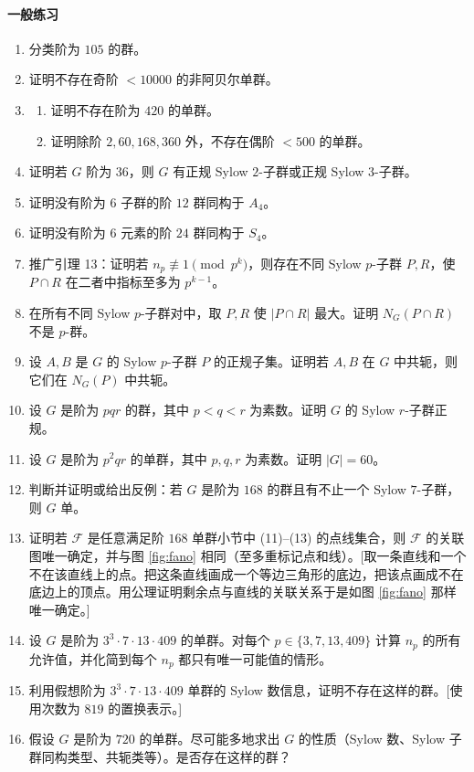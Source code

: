 \paragraph{一般练习}
\begin{enumerate}[label=\arabic*.,resume]
  \item 分类阶为 $105$ 的群。
  \item 证明不存在奇阶 $<10000$ 的非阿贝尔单群。
  \item \begin{enumerate}[label=(\alph*)]
    \item 证明不存在阶为 $420$ 的单群。
    \item 证明除阶 $2,60,168,360$ 外，不存在偶阶 $<500$ 的单群。
  \end{enumerate}
  \item 证明若 $G$ 阶为 $36$，则 $G$ 有正规 Sylow $2$-子群或正规 Sylow $3$-子群。
  \item 证明没有阶为 $6$ 子群的阶 $12$ 群同构于 $A_4$。
  \item 证明没有阶为 $6$ 元素的阶 $24$ 群同构于 $S_4$。
  \item 推广引理 13：证明若 $n_p\not\equiv1\pmod{p^k}$，则存在不同 Sylow $p$-子群 $P,R$，使 $P\cap R$ 在二者中指标至多为 $p^{k-1}$。
  \item 在所有不同 Sylow $p$-子群对中，取 $P,R$ 使 $|P\cap R|$ 最大。证明 $N_G(P\cap R)$ 不是 $p$-群。
  \item 设 $A,B$ 是 $G$ 的 Sylow $p$-子群 $P$ 的正规子集。证明若 $A,B$ 在 $G$ 中共轭，则它们在 $N_G(P)$ 中共轭。
  \item 设 $G$ 是阶为 $pqr$ 的群，其中 $p<q<r$ 为素数。证明 $G$ 的 Sylow $r$-子群正规。
  \item 设 $G$ 是阶为 $p^2qr$ 的单群，其中 $p,q,r$ 为素数。证明 $|G|=60$。
  \item 判断并证明或给出反例：若 $G$ 是阶为 $168$ 的群且有不止一个 Sylow $7$-子群，则 $G$ 单。
  \item 证明若 $\mathcal F$ 是任意满足阶 $168$ 单群小节中 (11)--(13) 的点线集合，则 $\mathcal F$ 的关联图唯一确定，并与图 \ref{fig:fano} 相同（至多重标记点和线）。[取一条直线和一个不在该直线上的点。把这条直线画成一个等边三角形的底边，把该点画成不在底边上的顶点。用公理证明剩余点与直线的关联关系于是如图 \ref{fig:fano} 那样唯一确定。]
  \item 设 $G$ 是阶为 $3^3\cdot7\cdot13\cdot409$ 的单群。对每个 $p\in\{3,7,13,409\}$ 计算 $n_p$ 的所有允许值，并化简到每个 $n_p$ 都只有唯一可能值的情形。
  \item 利用假想阶为 $3^3\cdot7\cdot13\cdot409$ 单群的 Sylow 数信息，证明不存在这样的群。[使用次数为 $819$ 的置换表示。]
  \item 假设 $G$ 是阶为 $720$ 的单群。尽可能多地求出 $G$ 的性质（Sylow 数、Sylow 子群同构类型、共轭类等）。是否存在这样的群？
\end{enumerate}

